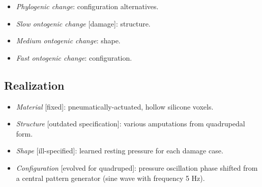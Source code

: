 \begin{itemize}
    \item \textit{Phylogenic change}: configuration alternatives.
    \item \textit{Slow ontogenic change} [damage]: structure.
    \item \textit{Medium ontogenic change}: shape.
    \item \textit{Fast ontogenic change}: configuration.
\end{itemize}


\subsection{Realization}

\begin{itemize}
    \item \textit{Material} [fixed]: pneumatically-actuated, hollow silicone voxels.
    \item \textit{Structure} [outdated specification]: various amputations from quadrupedal form.
    \item \textit{Shape} [ill-specified]: learned resting pressure for each damage case.
    \item \textit{Configuration} [evolved for quadruped]: pressure oscillation phase shifted from a central pattern generator (sine wave with frequency 5 Hz).
\end{itemize}






